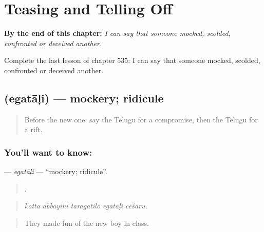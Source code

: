 
\chapter{Teasing and Telling Off}
\label{ch:te-teasing-and-telling-off}

\begin{chapteropening}
\textbf{By the end of this chapter:} \emph{I can say that someone mocked, scolded, confronted or deceived another.}

Complete the last lesson of chapter 535: I can say that someone mocked, scolded, confronted or deceived another.
\end{chapteropening}

\section[\texorpdfstring{\te{ఎగతాళి} (egatāḷi)}{ఎగతాళి (egatāḷi)}]{ (egatāḷi) — mockery; ridicule}

\label{lesson:TE-C535-egatali}



\begin{quote}
Before the new one: say the Telugu for a compromise, then the Telugu for a rift.
\end{quote}

\subsection*{You'll want to know: }
\textbf{} — \emph{egatāḷi} — \textquotedblleft{}mockery; ridicule\textquotedblright{}.

\begin{quote}
    .
\end{quote}

\begin{quote}
\emph{kotta abbāyini taragatilō egatāḷi cēśāru.}
\end{quote}

\begin{quote}
They made fun of the new boy in class.
\end{quote}

